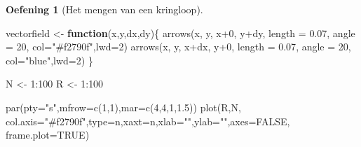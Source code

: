 \documentclass[
  a4paper,
]{scrbook}
\newenvironment{Shaded}{\begin{snugshade}}{\end{snugshade}}
\newcommand{\AttributeTok}[1]{\textcolor[rgb]{0.40,0.45,0.13}{#1}}
\newcommand{\ConstantTok}[1]{\textcolor[rgb]{0.56,0.35,0.01}{#1}}
\newcommand{\ControlFlowTok}[1]{\textcolor[rgb]{0.00,0.23,0.31}{\textbf{#1}}}
\newcommand{\DecValTok}[1]{\textcolor[rgb]{0.68,0.00,0.00}{#1}}
\newcommand{\FloatTok}[1]{\textcolor[rgb]{0.68,0.00,0.00}{#1}}
\newcommand{\FunctionTok}[1]{\textcolor[rgb]{0.28,0.35,0.67}{#1}}
\newcommand{\NormalTok}[1]{\textcolor[rgb]{0.00,0.23,0.31}{#1}}
\newcommand{\OtherTok}[1]{\textcolor[rgb]{0.00,0.23,0.31}{#1}}
\newcommand{\SpecialCharTok}[1]{\textcolor[rgb]{0.37,0.37,0.37}{#1}}
\newcommand{\StringTok}[1]{\textcolor[rgb]{0.13,0.47,0.30}{#1}}
\theoremstyle{definition}
\newtheorem{exercise}{Oefening}[chapter]
\theoremstyle{remark}
\begin{document}
\begin{exercise}[Het mengen van een
kringloop]
\begin{Shaded}
\begin{Highlighting}[]
\NormalTok{vectorfield }\OtherTok{\textless{}{-}} \ControlFlowTok{function}\NormalTok{(x,y,dx,dy)\{}
  \FunctionTok{arrows}\NormalTok{(x, y, x}\SpecialCharTok{+}\DecValTok{0}\NormalTok{, y}\SpecialCharTok{+}\NormalTok{dy, }\AttributeTok{length =} \FloatTok{0.07}\NormalTok{, }\AttributeTok{angle =} \DecValTok{20}\NormalTok{, }\AttributeTok{col=}\StringTok{"\#f2790f"}\NormalTok{,}\AttributeTok{lwd=}\DecValTok{2}\NormalTok{)}
  \FunctionTok{arrows}\NormalTok{(x, y, x}\SpecialCharTok{+}\NormalTok{dx, y}\SpecialCharTok{+}\DecValTok{0}\NormalTok{, }\AttributeTok{length =} \FloatTok{0.07}\NormalTok{, }\AttributeTok{angle =} \DecValTok{20}\NormalTok{, }\AttributeTok{col=}\StringTok{"blue"}\NormalTok{,}\AttributeTok{lwd=}\DecValTok{2}\NormalTok{)}
\NormalTok{\}}

\NormalTok{N }\OtherTok{\textless{}{-}} \DecValTok{1}\SpecialCharTok{:}\DecValTok{100}
\NormalTok{R }\OtherTok{\textless{}{-}} \DecValTok{1}\SpecialCharTok{:}\DecValTok{100}

\FunctionTok{par}\NormalTok{(}\AttributeTok{pty=}\StringTok{"s"}\NormalTok{,}\AttributeTok{mfrow=}\FunctionTok{c}\NormalTok{(}\DecValTok{1}\NormalTok{,}\DecValTok{1}\NormalTok{),}\AttributeTok{mar=}\FunctionTok{c}\NormalTok{(}\DecValTok{4}\NormalTok{,}\DecValTok{4}\NormalTok{,}\DecValTok{1}\NormalTok{,}\FloatTok{1.5}\NormalTok{))}
\FunctionTok{plot}\NormalTok{(R,N,  }\AttributeTok{col.axis=}\StringTok{"\#f2790f"}\NormalTok{,}\AttributeTok{type=}\StringTok{\textquotesingle{}n\textquotesingle{}}\NormalTok{,}\AttributeTok{xaxt=}\StringTok{\textquotesingle{}n\textquotesingle{}}\NormalTok{,}\AttributeTok{xlab=}\StringTok{""}\NormalTok{,}\AttributeTok{ylab=}\StringTok{""}\NormalTok{,}\AttributeTok{axes=}\ConstantTok{FALSE}\NormalTok{, }\AttributeTok{frame.plot=}\ConstantTok{TRUE}\NormalTok{)}


\end{Highlighting}
\end{Shaded}
\end{exercise}
\end{document}

